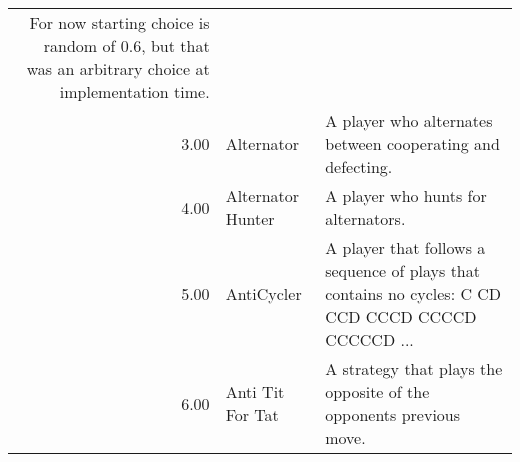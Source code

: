 \begin{table}[!hbtp]
\begin{adjustbox}{width=2\textwidth, angle=90}
\begin{tabular}{rll}
	For now starting choice is random of 0.6, but that was an arbitrary choice
	at implementation time.                                                                                                                                                                                                                                                                                                                                                                                                                                                                                                                                                                                                                                                                               \\
	3.00   & Alternator                  & A player who alternates between cooperating and defecting.                                                                        \\
	4.00   & Alternator Hunter           & A player who hunts for alternators.                                                                                               \\
	5.00   & AntiCycler                  & A player that follows a sequence of plays that contains no cycles:
	C CD CCD CCCD CCCCD CCCCCD ...                                                                                                                                                                                                                                                                                                                                                                                                                                                                                                                                                                                                                                                                                                                                                                                                                                                                                                                    \\
	6.00   & Anti Tit For Tat            & A strategy that plays the opposite of the opponents previous move.

\end{tabular}
\end{adjustbox}
\end{table}
